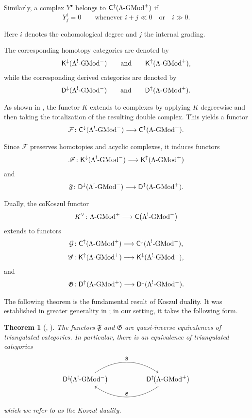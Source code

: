 \documentclass[11pt]{article}
\newtheorem{theorem}{Theorem}[section]
\theoremstyle{definition}
\theoremstyle{remark}
\begin{document}
Similarly, a complex \(Y^\bullet\) belongs to
\(\mathsf{C}^{\uparrow}(\Lambda\textup{-GMod}^{+})\)
if
\[
Y^i_j=0
\qquad
\text{whenever }
i+j\ll 0
\quad\text{or}\quad
i\gg 0.
\]

Here \(i\) denotes the cohomological degree and \(j\) the internal grading.

\medskip

The corresponding homotopy categories are denoted by
\[
\mathsf{K}^{\downarrow}(\Lambda^{!}\textup{-GMod}^{-})
\qquad\text{and}\qquad
\mathsf{K}^{\uparrow}(\Lambda\textup{-GMod}^{+}),
\]
while the corresponding derived categories are denoted by
\[
\mathsf{D}^{\downarrow}(\Lambda^{!}\textup{-GMod}^{-})
\qquad\text{and}\qquad
\mathsf{D}^{\uparrow}(\Lambda\textup{-GMod}^{+}).
\]

As shown in \cite[Section~5]{11, 12}, the functor \(K\) extends to complexes by applying \(K\) degreewise and then taking the totalization of the resulting double complex. This yields a functor
\[
\mathcal{F}\colon
\mathsf{C}^{\downarrow}(\Lambda^{!}\textup{-GMod}^{-})
\longrightarrow
\mathsf{C}^{\uparrow}(\Lambda\textup{-GMod}^{+}).
\]

Since \(\mathcal{F}\) preserves homotopies and acyclic complexes, it induces functors
\[
\mathscr{F}\colon
\mathsf{K}^{\downarrow}(\Lambda^{!}\textup{-GMod}^{-})
\longrightarrow
\mathsf{K}^{\uparrow}(\Lambda\textup{-GMod}^{+})
\]
and
\[
\mathfrak{F}\colon
\mathsf{D}^{\downarrow}(\Lambda^{!}\textup{-GMod}^{-})
\longrightarrow
\mathsf{D}^{\uparrow}(\Lambda\textup{-GMod}^{+}).
\]

Dually, the coKoszul functor
\[
K^{\vee}\colon
\Lambda\textup{-GMod}^{+}
\longrightarrow
\mathsf{C}\bigl(\Lambda^{!}\textup{-GMod}^{-}\bigr)
\]
extends to functors
\[
\mathcal{G}\colon
\mathsf{C}^{\uparrow}(\Lambda\textup{-GMod}^{+})
\longrightarrow
\mathsf{C}^{\downarrow}(\Lambda^{!}\textup{-GMod}^{-}),
\]
\[
\mathscr{G}\colon
\mathsf{K}^{\uparrow}(\Lambda\textup{-GMod}^{+})
\longrightarrow
\mathsf{K}^{\downarrow}(\Lambda^{!}\textup{-GMod}^{-}),
\]
and
\[
\mathfrak{G}\colon
\mathsf{D}^{\uparrow}(\Lambda\textup{-GMod}^{+})
\longrightarrow
\mathsf{D}^{\downarrow}(\Lambda^{!}\textup{-GMod}^{-}).
\]

The following theorem is the fundamental result of Koszul duality. It was established in greater generality in \cite{11,12}; in our setting, it takes the following form.

\begin{theorem}[{\cite[Theorem~5.16]{11}}, {\cite[Theorem~5.7]{12}}]
\label{thm:koszul-duality}
The functors \(\mathfrak{F}\) and \(\mathfrak{G}\) are quasi-inverse
equivalences of triangulated categories. In particular, there is an equivalence
of triangulated categories
\[
\begin{tikzcd}[column sep=huge]
\mathsf{D}^{\downarrow}\!\bigl(\Lambda^{!}\textup{-}\mathrm{GMod}^{-}\bigr)
\arrow[r, bend left=35, "\mathfrak{F}"]
&
\mathsf{D}^{\uparrow}\!\bigl(\Lambda\textup{-}\mathrm{GMod}^{+}\bigr)
\arrow[l, bend left=35, "\mathfrak{G}"']
\end{tikzcd}
\]
which we refer to as the \emph{Koszul duality}.
\end{theorem}
\end{document}
